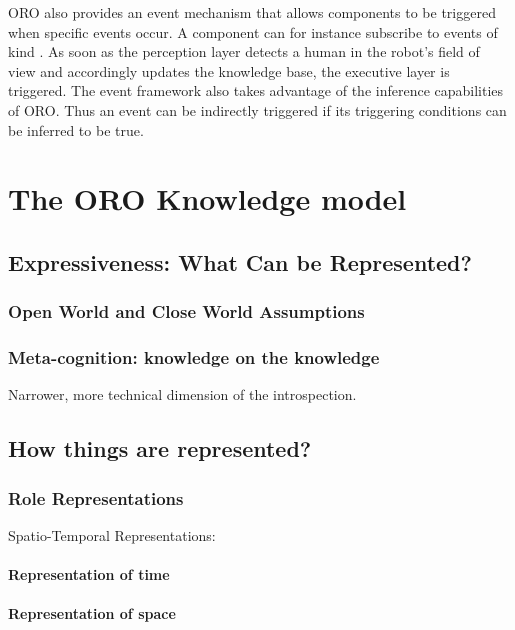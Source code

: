 ORO also provides an event mechanism that allows components to be triggered
when specific events occur. A component can for instance subscribe to events
of kind . As soon as the
perception layer detects a human in the robot's field of view and accordingly
updates the knowledge base, the executive layer is triggered. The event
framework also takes advantage of the inference capabilities of ORO. Thus an
event can be indirectly triggered if its triggering conditions can be
inferred to be true.




\section{The ORO Knowledge model}
\label{sect|knowledge-model}

\subsection{Expressiveness: What Can be Represented?}
\subsubsection{Open World and Close World Assumptions}
\subsubsection{Meta-cognition: knowledge on the knowledge}
Narrower, more technical dimension of the introspection.

\subsection{How things are represented?}
\subsubsection{Role Representations}
Spatio-Temporal Representations:

\paragraph{Representation of time}
\paragraph{Representation of space}

